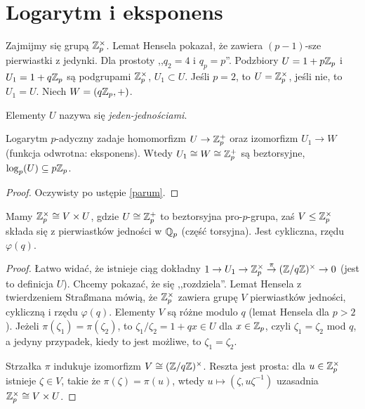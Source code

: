 \section{Logarytm i eksponens \label{sekcjalog}}
Zajmijmy  się grupą $\mathbb Z_p^\times$.
Lemat Hensela pokazał, że zawiera $(p-1)$-sze pierwiastki z jedynki.
Dla prostoty ,,$q_2 = 4$ i $q_p = p$''.
Podzbiory $U = 1 + p\mathbb Z_p$ i $U_1 = 1 + q\mathbb Z_p$ są podgrupami $\mathbb Z_p^\times$, $U_1 \subset U$. Jeśli $p = 2$, to $U = \mathbb Z_p^\times$, jeśli nie, to $U_1 = U$.
Niech $W = (q\mathbb Z_p, +)$.

\begin{definicja}
	Elementy $U$ nazywa się \emph{jeden-jednościami}.
\end{definicja}

\begin{fakt}
	Logarytm $p$-adyczny zadaje homomorfizm $U \to \mathbb Z_p^+$ oraz izomorfizm $U_1 \to W$ (funkcja odwrotna: eksponens).
	Wtedy $U_1 \cong W \cong \mathbb Z_p^+$ są beztorsyjne, $\log_p(U) \subseteq p\mathbb Z_p$.
\end{fakt}

\begin{proof}
	Oczywisty po ustępie \ref{parum}.
\end{proof}

\begin{wniosek}\label{hostis}
	Mamy $\mathbb Z_p^\times \cong V \times U$, gdzie $U \cong \mathbb Z_p^+$ to beztorsyjna pro-$p$-grupa, zaś $V \le \mathbb Z_p^\times$ składa się z pierwiastków jedności w $\mathbb Q_p$ (część torsyjna).
	Jest cykliczna, rzędu $\varphi(q)$.
\end{wniosek}

\begin{proof}
	Łatwo widać, że istnieje ciąg dokładny $1 \to U_1 \to \mathbb Z_p^\times \stackrel \pi \to  (\mathbb Z/q\mathbb Z)^\times \to 0$ (jest to definicja $U$).
	Chcemy pokazać, że się ,,rozdziela''.
	Lemat Hensela z twierdzeniem Straßmana mówią, że $\mathbb Z_p^\times$ zawiera grupę $V$ pierwiastków jedności, cykliczną i rzędu $\varphi(q)$.
	Elementy $V$ są różne modulo $q$ (lemat Hensela dla $p > 2$).
	Jeżeli $\pi(\zeta_1) = \pi(\zeta_2)$, to $\zeta_1 / \zeta_2 = 1 + qx \in U$ dla $x \in \mathbb Z_p$, czyli $\zeta_1 = \zeta_2$ mod $q$, a jedyny przypadek, kiedy to jest możliwe, to $\zeta_1 = \zeta_2$.

	Strzałka $\pi$ indukuje izomorfizm $V \cong (\mathbb Z/q\mathbb Z)^\times$.
	Reszta jest prosta: dla $u \in \mathbb Z_p^\times$ istnieje $\zeta \in V$, takie że $\pi(\zeta) = \pi(u)$, wtedy $u \mapsto (\zeta, u \zeta^{-1})$ uzasadnia $\mathbb Z_p^\times \cong V \times U$.
\end{proof}

